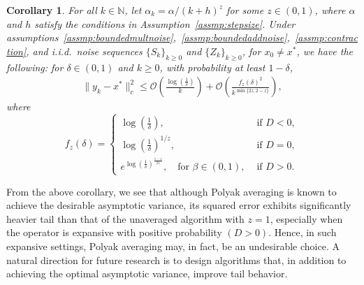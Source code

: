 \documentclass{article}
\newcommand{\N}{\mathbb{N}}
\newtheorem{corollary}{Corollary}[theorem]
\begin{document}
\begin{corollary} 
    For all $k\in\N$, let $\alpha_k = \alpha/(k+h)^z$ for some $z\in(0,1)$, where $\alpha$ and $h$ satisfy the conditions in Assumption~\ref{assmp:stepsize}. Under assumptions~\ref{assmp:boundedmultnoise},~\ref{assmp:boundedaddnoise},~\ref{assmp:contraction}, and i.i.d.\ noise sequences $\{S_k\}_{k\geq 0}$ and $\{Z_k\}_{k\geq 0}$, for $x_0 \ne x^*$, we have the following: for  $\delta\in(0,1)$ and $k\geq 0$, with probability at least $1-\delta$, %
    \begin{align*}
        \|y_k - x^*\|_c^2 \leq \mathcal{O}\left(\frac{\log\left(\frac{1}{\delta}\right)}{k}\right) + \mathcal{O}\left(\frac{f_z(\delta)^2}{k^{\min\{2z,2-z\}}}\right),
    \end{align*}
    where
    \begin{equation*}
        f_z(\delta) = \begin{cases}
            \log\left(\frac{1}{\delta}\right), & \text{ if } D < 0, \\
            \log\left(\frac{1}{\delta}\right)^{1/z}, & \text{ if } D = 0, \\
            e^{\log\left(\frac{1}{\delta}\right)^\frac{1-z}{ \beta z}}, \quad \text{for } \beta\in(0,1), & \text{ if } D > 0.
        \end{cases}
    \end{equation*}
\end{corollary}

From the above corollary, we see that although Polyak averaging is known to achieve the desirable asymptotic variance, its squared error exhibits significantly heavier tail than that of the unaveraged algorithm with $z = 1$, especially when the operator is expansive with positive probability $(D > 0)$. Hence, in such expansive settings, Polyak averaging may, in fact, be an undesirable choice. A natural direction for future research is to design algorithms that, in addition to achieving the optimal asymptotic variance, improve tail behavior.

\end{document}
